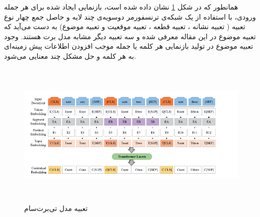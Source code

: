  

همانطور که در شکل \ref{fig:tBert_embded} نشان داده شده است، بازنمایی ایجاد شده برای هر جمله ورودی، با استفاده از یک شبکه‌ی ترنسفورمر دوسویه‌ی
 چند لایه و  حاصل جمع چهار نوع تعبیه ( تعبیه نشانه
، تعبیه قطعه
، تعبیه موقعیت و تعبیه موضوع) به دست ‌می‌آید که تعبیه موضوع در این مقاله معرفی شده و سه تعبیه دیگر مشابه مدل برت هستند. وجود تعبیه موضوع در تولید بازنمایی هر کلمه یا جمله موجب افزودن اطلاعات پیش زمینه‌ای به هر کلمه و حل مشکل چند معنایی  می‌شود.
 \begin{figure}[!h]
	\begin{center}
		\includegraphics[height=7cm]{TbertSum_embedding.png}
	\end{center}
	\caption{ تعبیه مدل تی‌برت‌سام \cite{Ma2022TBERTSumTT}}
	\label{fig:tBert_embded}
	\medskip
	\small
\end{figure}

